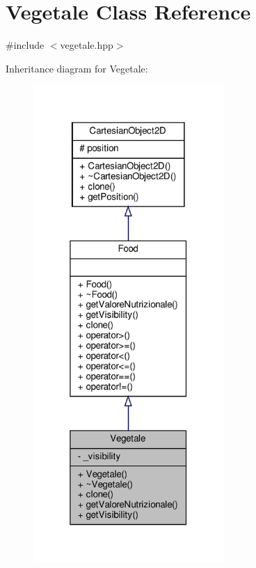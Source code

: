 \hypertarget{classVegetale}{}\section{Vegetale Class Reference}
\label{classVegetale}


{\ttfamily \#include $<$vegetale.\+hpp$>$}



Inheritance diagram for Vegetale\+:\nopagebreak
\begin{figure}[H]
\begin{center}
\leavevmode
\includegraphics[width=205pt]{classVegetale__inherit__graph}
\end{center}
\end{figure}


